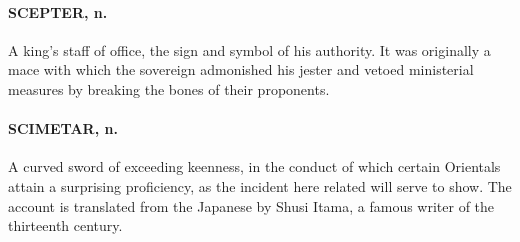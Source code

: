 \documentclass[11pt]{article}
\begin{document}
\paragraph{SCEPTER, n.}  A king's staff of office, the sign and symbol of his
authority.  It was originally a mace with which the sovereign
admonished his jester and vetoed ministerial measures by breaking the
bones of their proponents.

\paragraph{SCIMETAR, n.}  A curved sword of exceeding keenness, in the conduct of
which certain Orientals attain a surprising proficiency, as the
incident here related will serve to show.  The account is translated
from the Japanese by Shusi Itama, a famous writer of the thirteenth
century.
\end{document}
